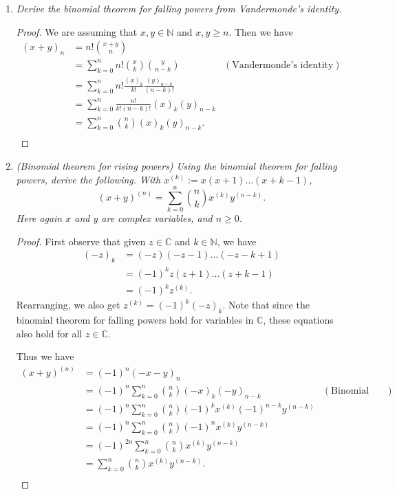 \documentclass{article}
\begin{document}
\begin{enumerate}[label={\bf Q\arabic*:}]
  \item \it Derive the binomial theorem for falling powers from
    Vandermonde's identity.

    \begin{proof}
      We are assuming that $x,y\in\mathbb{N}$ and $x,y\geq n$. Then we have
      \begin{align*}
        (x+y)_n &=n!\binom{x+y}{n} \\
        &=\sum_{k=0}^nn!\binom{x}{k}\binom{y}{n-k} &(\text{Vandermonde's
          identity}) \\
        &=\sum_{k=0}^nn!\frac{(x)_k}{k!}\frac{(y)_{n-k}}{(n-k)!} \\
        &=\sum_{k=0}^n\frac{n!}{k!(n-k)!}(x)_k(y)_{n-k} \\
        &=\sum_{k=0}^n\binom{n}{k}(x)_k(y)_{n-k}. \\
      \end{align*}
    \end{proof}

  \item \it (Binomial theorem for rising powers) Using the binomial theorem
    for falling powers, derive the following. With
    $x^{(k)}:=x(x+1)\ldots(x+k-1)$,
    \[(x+y)^{(n)} =\sum_{k=0}^n\binom{n}{k}x^{(k)}y^{(n-k)}.\]
    Here again $x$ and $y$ are complex variables, and $n\geq0$.

    \begin{proof}
      First observe that given $z\in\mathbb{C}$ and $k\in\mathbb{N}$, we
      have
      \begin{align*}
        (-z)_{k} &=(-z)(-z-1)\ldots(-z-k+1) \\
        &=(-1)^kz(z+1)\ldots(z+k-1) \\
        &=(-1)^kz^{(k)}.
      \end{align*}
      Rearranging, we also get $z^{(k)}=(-1)^k(-z)_k$.  Note that since the
      binomial theorem for falling powers hold for variables in
      $\mathbb{C}$, these equations also hold for all $z\in\mathbb{C}$.

      Thus we have
      \begin{align*}
        (x+y)^{(n)} &=(-1)^n(-x-y)_{n} \\
        &=(-1)^n \sum_{k=0}^{n} \binom{n}{k}(-x)_{k}(-y)_{n-k}
          &(\text{Binomial theorem for falling powers}) \\
        &=(-1)^n \sum_{k=0}^{n} \binom{n}{k} (-1)^kx^{(k)}
          (-1)^{n-k}y^{(n-k)} \\
        &=(-1)^n \sum_{k=0}^{n} \binom{n}{k} (-1)^nx^{(k)} y^{(n-k)} \\
        &=(-1)^{2n} \sum_{k=0}^{n} \binom{n}{k} x^{(k)} y^{(n-k)} \\
        &=\sum_{k=0}^{n} \binom{n}{k} x^{(k)} y^{(n-k)}. \\
      \end{align*}
    \end{proof}
\end{enumerate}
\end{document}
